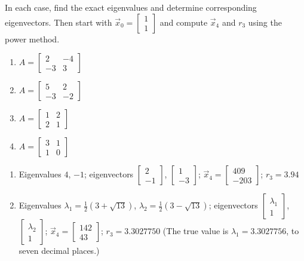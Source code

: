 \documentclass{ximera}
\begin{document}
\begin{problem}\label{prob:employ_power}
In each case, find the exact eigenvalues and determine corresponding eigenvectors. Then start with $\vec{x}_{0} = \left[ \begin{array}{rr}
1  \\
1
\end{array}\right]$ and compute $\vec{x}_{4}$ and $r_{3}$ using the power method.


\begin{enumerate}
\item $A = \left[ \begin{array}{rr}
2 & -4 \\
-3 & 3
\end{array}\right]$
\item $A = \left[ \begin{array}{rr}
5 & 2 \\
-3 & -2
\end{array}\right]$
\item $A = \left[ \begin{array}{rr}
1 & 2 \\
2 & 1
\end{array}\right]$
\item $A = \left[ \begin{array}{rr}
3 & 1 \\
1 & 0
\end{array}\right]$
\end{enumerate}
\begin{hint}
\begin{enumerate}
\item Eigenvalues $4$, $-1$; eigenvectors
$\left[ \begin{array}{rr}
2  \\
-1
\end{array}\right]$,
$\left[ \begin{array}{rr}
1 \\
-3
\end{array}\right]$;
$\vec{x}_{4} = \left[ \begin{array}{rr}
409  \\
-203
\end{array}\right]$;
$r_{3} = 3.94$


\item Eigenvalues $\lambda_{1} = \frac{1}{2}(3 + \sqrt{13})$, $\lambda_{2} = \frac{1}{2}(3 - \sqrt{13})$;
eigenvectors $\left[ \begin{array}{c}
\lambda_{1}  \\
1
\end{array}\right]$,
$\left[ \begin{array}{c}
\lambda_{2}  \\
1
\end{array}\right]$;
$\vec{x}_{4} = \left[ \begin{array}{rr}
142  \\
43
\end{array}\right]$;
$r_{3} = 3.3027750$
(The true value is $\lambda_{1} = 3.3027756$, to seven decimal places.)
\end{enumerate}
\end{hint}
\end{problem}
\end{document}
